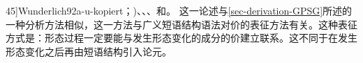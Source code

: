   45]{Wunderlich92a-u-kopiert}；\citeyear[--126]{Wunderlich97c})、、、和。
    这一论述与\ref{sec-derivation-GPSG}所述的一种分析方法相似，这一方法与广义短语结构语法对价的表征方法有关。这种表征方式是：形态过程一定要能与发生形态变化的成分的价建立联系。这不同于在发生形态变化之后再由短语结构引入论元。

